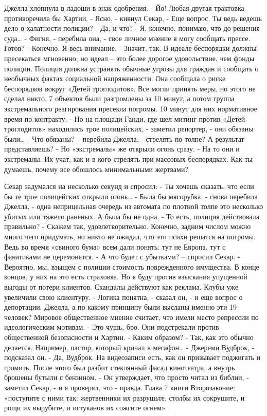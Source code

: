 \documentclass{book}
\begin{document}
Джелла хлопнула в ладоши в знак одобрения.
- Йо! Любая другая трактовка противоречила бы Хартии.
- Ясно, - кивнул Секар, - Еще вопрос. Ты ведь ведешь дело о халатности полиции?
- Да, и что?
- Я, конечно, понимаю, что до решения суда\ldots{}
- Фигня, - перебила она, - свое личное мнение я могу сообщать прессе. Готов?
- Конечно. Я весь внимание.
- Значит, так. В идеале беспорядки должны пресекаться мгновенно, но идеал -- это более дорогое удовольствие, чем фонды полиции. Полиция должна устранять обычные угрозы для граждан и сообщать о необычных фактах социальной напряженности. Она сообщала о риске беспорядков вокруг «Детей троглодитов». Все могли принять меры, но этого не сделал никто. 7 объектов были разгромлены за 10 минут, а потом группа экстремального реагирования пресекла погромы. 10 минут для них нормативное время по контракту.
- Но на площади Ганди, где шел митинг против «Детей троглодитов» находились трое полицейских, - заметил репортер, - они обязаны были\ldots{}
- Что обязаны? -- перебила Джелла, - стрелять по толпе? А результат представляешь?
- Но «экстремалы» же открыли огонь сразу.
- На то они и экстремалы. Их учат, как и в кого стрелять при массовых беспорядках. Как ты думаешь, почему все обошлось минимальными жертвами?

Секар задумался на несколько секунд и спросил:
- Ты хочешь сказать, что если бы те трое полицейских открыли огонь\ldots{}
- Была бы мясорубка, - снова перебила Джелла, - одна неприцельная очередь из автомата по плотной толпе это несколько убитых или тяжело раненых. А была бы не одна.
- То есть, полиция действовала правильно?
- Скажем так, удовлетворительно. Конечно, задним числом можно много чего придумать, но никто не ожидал, что эти психи решатся на погромы. Ведь во время «свиного бума» всем дали понять: тут не Европа, тут с фанатиками не церемонятся.
- А что будет с убытками? -- спросил Секар.
- Вероятно, мы, взыщем с полиции стоимость поврежденного имущества. В конце концов, у них на это есть страховка. Но я буду против взыскания упущенной выгоды от потери клиентов. Скандалы действуют как реклама. Клубы уже увеличили свою клиентуру.
- Логика понятна, - сказал он, - и еще вопрос о депортации. Джелла, а по какому принципу были высланы именно эти 19 человек? Мировое общественное мнение считает, что имели место репрессии по идеологическим мотивам.
- Это чушь, бро. Они подстрекали против общественной безопасности и Хартии.
- Каким образом?
- Так, как это обычно делается. Например, пастор, который кричал в мегафон\ldots{}
- Джереми Вудброк, - подсказал он.
- Да, Вудброк. На видеозаписи есть, как он призывает поджигать и громить. После этого был разбит стеклянный фасад кинотеатра, а внутрь брошены бутыли с бензином.
- Он утверждает, что просто читал из библии, - заметил Секар, - и я проверял, это - правда. Глава 7 книги Второзаконие: «поступите с ними так: жертвенники их разрушьте, столбы их сокрушите, и рощи их вырубите, и истуканов их сожгите огнем».
\end{document}

